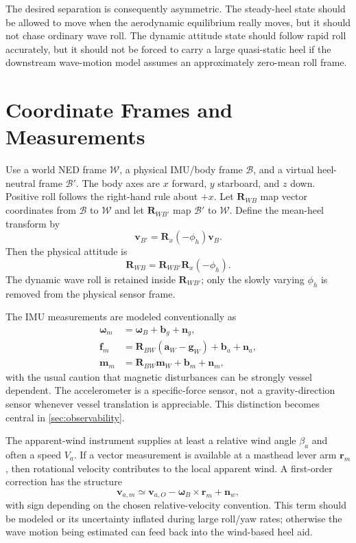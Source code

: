 \documentclass[conference]{IEEEtran}
\DeclareRobustCommand{\vct}[1]{\bm{#1}}
\DeclareRobustCommand{\mat}[1]{\bm{#1}}
\begin{document}
The desired separation is consequently asymmetric. The steady-heel state should be
allowed to move when the aerodynamic equilibrium really moves, but it should not chase
ordinary wave roll. The dynamic attitude state should follow rapid roll accurately, but
it should not be forced to carry a large quasi-static heel if the downstream wave-motion
model assumes an approximately zero-mean roll frame.

\section{Coordinate Frames and Measurements}
\label{sec:frames}

Use a world NED frame $\mathcal W$, a physical IMU/body frame $\mathcal B$, and a virtual
heel-neutral frame $\mathcal B'$. The body axes are $x$ forward, $y$ starboard, and $z$
down. Positive roll follows the right-hand rule about $+x$. Let
$\mat R_{WB}$ map vector coordinates from $\mathcal B$ to $\mathcal W$ and let
$\mat R_{WB'}$ map $\mathcal B'$ to $\mathcal W$. Define the mean-heel transform by
\begin{equation}
 \vct v_{B'}=\mat R_x(-\phi_h)\vct v_B.
 \label{eq:deheel-vector}
\end{equation}
Then the physical attitude is
\begin{equation}
 \boxed{\mat R_{WB}=\mat R_{WB'}\mat R_x(-\phi_h).}
 \label{eq:attitude-compose}
\end{equation}
The dynamic wave roll is retained inside $\mat R_{WB'}$; only the slowly varying
$\phi_h$ is removed from the physical sensor frame.

The IMU measurements are modeled conventionally as
\begin{align}
 \vct\omega_m &= \vct\omega_B+\vct b_g+\vct n_g,\\
 \vct f_m &= \mat R_{BW}(\vct a_W-\vct g_W)+\vct b_a+\vct n_a,\\
 \vct m_m &= \mat R_{BW}\vct m_W+\vct b_m+\vct n_m,
 \label{eq:imu-model}
\end{align}
with the usual caution that magnetic disturbances can be strongly vessel dependent. The
accelerometer is a specific-force sensor, not a gravity-direction sensor whenever vessel
translation is appreciable. This distinction becomes central in
\cref{sec:observability}.

The apparent-wind instrument supplies at least a relative wind angle $\beta_a$ and often
a speed $V_a$. If a vector measurement is available at a masthead lever arm $\vct r_m$,
then rotational velocity contributes to the local apparent wind. A first-order correction
has the structure
\begin{equation}
 \vct v_{a,m}
 \simeq \vct v_{a,O}-\vct\omega_B\times\vct r_m+\vct n_w,
 \label{eq:wind-lever}
\end{equation}
with sign depending on the chosen relative-velocity convention. This term should be
modeled or its uncertainty inflated during large roll/yaw rates; otherwise the wave
motion being estimated can feed back into the wind-based heel aid.
\end{document}

